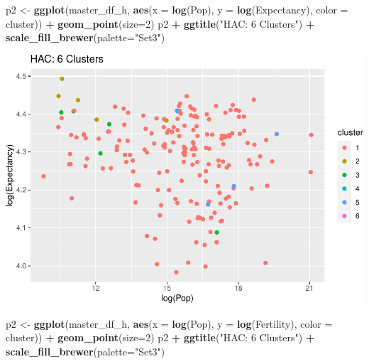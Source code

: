 \documentclass[]{article}
\newenvironment{Shaded}{\begin{snugshade}}{\end{snugshade}}
\newcommand{\DataTypeTok}[1]{\textcolor[rgb]{0.13,0.29,0.53}{#1}}
\newcommand{\DecValTok}[1]{\textcolor[rgb]{0.00,0.00,0.81}{#1}}
\newcommand{\KeywordTok}[1]{\textcolor[rgb]{0.13,0.29,0.53}{\textbf{#1}}}
\newcommand{\NormalTok}[1]{#1}
\newcommand{\OperatorTok}[1]{\textcolor[rgb]{0.81,0.36,0.00}{\textbf{#1}}}
\newcommand{\StringTok}[1]{\textcolor[rgb]{0.31,0.60,0.02}{#1}}
\begin{document}
\begin{Shaded}
\begin{Highlighting}[]
\NormalTok{p2 <-}\StringTok{ }\KeywordTok{ggplot}\NormalTok{(master_df_h, }\KeywordTok{aes}\NormalTok{(}\DataTypeTok{x =} \KeywordTok{log}\NormalTok{(Pop), }\DataTypeTok{y =} \KeywordTok{log}\NormalTok{(Expectancy), }\DataTypeTok{color =}\NormalTok{ cluster)) }\OperatorTok{+}
\StringTok{  }\KeywordTok{geom_point}\NormalTok{(}\DataTypeTok{size=}\DecValTok{2}\NormalTok{)}
\NormalTok{p2 }\OperatorTok{+}\StringTok{ }\KeywordTok{ggtitle}\NormalTok{(}\StringTok{"HAC: 6 Clusters"}\NormalTok{) }\OperatorTok{+}\StringTok{ }\KeywordTok{scale_fill_brewer}\NormalTok{(}\DataTypeTok{palette=}\StringTok{"Set3"}\NormalTok{)}
\end{Highlighting}
\end{Shaded}

\includegraphics{eda_files/figure-latex/unnamed-chunk-27-6.pdf}

\begin{Shaded}
\begin{Highlighting}[]
\NormalTok{p2 <-}\StringTok{ }\KeywordTok{ggplot}\NormalTok{(master_df_h, }\KeywordTok{aes}\NormalTok{(}\DataTypeTok{x =} \KeywordTok{log}\NormalTok{(Pop), }\DataTypeTok{y =} \KeywordTok{log}\NormalTok{(Fertility), }\DataTypeTok{color =}\NormalTok{ cluster)) }\OperatorTok{+}
\StringTok{  }\KeywordTok{geom_point}\NormalTok{(}\DataTypeTok{size=}\DecValTok{2}\NormalTok{)}
\NormalTok{p2 }\OperatorTok{+}\StringTok{ }\KeywordTok{ggtitle}\NormalTok{(}\StringTok{"HAC: 6 Clusters"}\NormalTok{) }\OperatorTok{+}\StringTok{ }\KeywordTok{scale_fill_brewer}\NormalTok{(}\DataTypeTok{palette=}\StringTok{"Set3"}\NormalTok{)}
\end{Highlighting}
\end{Shaded}
\end{document}
